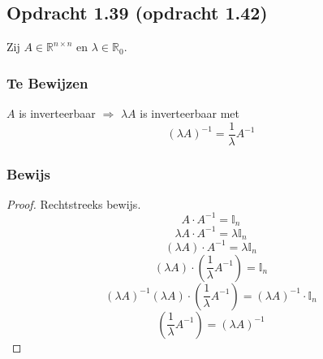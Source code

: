 \documentclass[lineaire_algebra_oplossingen.tex]{subfiles}
\begin{document}
\subsection{Opdracht 1.39 (opdracht 1.42)}
\label{1.39}
Zij $A\in \mathbb{R}^{n\times n}$ en $\lambda \in \mathbb{R}_0$.
\subsubsection*{Te Bewijzen}
$A$ is inverteerbaar $\Rightarrow$ $\lambda A$ is inverteerbaar met 
\[
(\lambda A)^{-1} = \frac{1}{\lambda}A^{-1}
\]

\subsubsection*{Bewijs}
\begin{proof}
Rechtstreeks bewijs.\\
\[
A\cdot A^{-1} = \mathbb{I}_n
\]
\[
\lambda A\cdot A^{-1} = \lambda\mathbb{I}_n
\]
\[
(\lambda A)\cdot A^{-1} = \lambda\mathbb{I}_n
\]
\[
(\lambda A)\cdot (\frac{1}{\lambda}A^{-1}) = \mathbb{I}_n
\]
$$(\lambda A)^{-1}(\lambda A)\cdot (\frac{1}{\lambda}A^{-1}) = (\lambda A)^{-1} \cdot \mathbb{I}_n$$
$$(\frac{1}{\lambda}A^{-1}) = (\lambda A)^{-1}$$
\end{proof}
\end{document}
